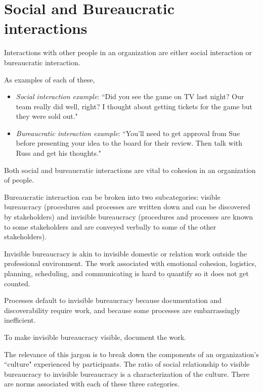 
\section{Social and Bureaucratic interactions\label{sec:socializing}}

Interactions with other people in an organization are either social interaction or bureaucratic interaction. 

As examples of each of these,
\begin{itemize}
\item \textit{Social interaction example}: ``Did you see the game on TV last night? Our team really did well, right? I thought about getting tickets for the game but they were sold out."
\item \textit{Bureaucratic interaction example}: ``You'll need to get approval from Sue before presenting your idea to the board for their review. Then talk with Russ and get his thoughts."
\end{itemize}
Both social and bureaucratic interactions are vital to cohesion in an organization of people. 


Bureaucratic interaction can be broken into two subcategories: \gls{visible bureaucracy} (procedures and processes are written down and can be discovered by stakeholders)  and \gls{invisible bureaucracy} (procedures and processes are known to some stakeholders and are conveyed verbally to some of the other stakeholders).

Invisible bureaucracy is akin to invisible domestic or relation work outside the professional environment. The work associated with emotional cohesion, logistics, planning, scheduling, and communicating is hard to quantify so it does not get counted.

Processes default to invisible bureaucracy because documentation and discoverability require work, and because some processes are embarrassingly inefficient. 

To make invisible bureaucracy visible, document the work.


The relevance of this jargon is to break down the components of an organization's ``culture" experienced by participants. The ratio of social relationship to visible bureaucracy to invisible bureaucracy is a characterization of the culture. There are norms associated with each of these three categories.
